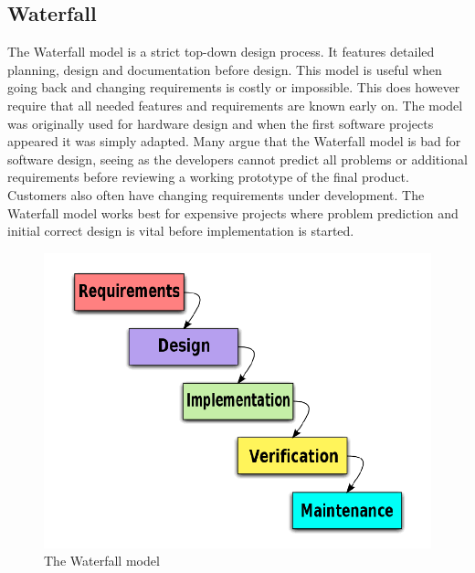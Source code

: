 \subsection{Waterfall}
The Waterfall model is a strict top-down design process. \cite{bib:waterfall}It features detailed planning, design and
documentation before design. This model is useful when going back and changing requirements is
costly or impossible. This does however require that all needed features and requirements are known
early on. The model was originally used for hardware design and when the first software projects 
appeared it was simply adapted. Many argue that the Waterfall model is bad for software design, seeing
as the developers cannot predict all problems or additional requirements before reviewing a working
prototype of the final product. Customers also often have changing requirements under development.
The Waterfall model works best for expensive projects where problem prediction and initial correct design
is vital before implementation is started.
\begin{figure}[h!]
\centering \includegraphics[scale=0.30]{img/designmodel-waterwall} \caption{The Waterfall model}
\label{fig:desigmodel-waterfall}
\end{figure}

